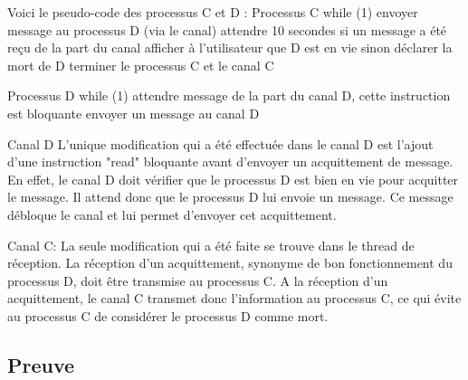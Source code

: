 \documentclass[a4paper, 10pt, french]{article}
\begin{document}
Voici le pseudo-code des processus C et D : 
Processus C
while (1) {
	envoyer message au processus D (via le canal)
	attendre 10 secondes
	si un message a été reçu de la part du canal {
		afficher à l'utilisateur que D est en vie
	} sinon {
		déclarer la mort de D
		terminer le processus C et le canal C
	}
}


Processus D
while (1) {
	attendre message de la part du canal D, cette instruction est bloquante
	envoyer un message au canal D
}

Canal D
L'unique modification qui a été effectuée dans le canal D est l'ajout d'une instruction "read" bloquante avant d'envoyer un acquittement de message. En effet, le canal D doit vérifier que le processus D est bien en vie pour acquitter le message. Il attend donc que le processus D lui envoie un message. Ce message débloque le canal et lui permet d'envoyer cet acquittement.

Canal C:
La seule modification qui a été faite se trouve dans le thread de réception. La réception d'un acquittement, synonyme de bon fonctionnement du processus D, doit être transmise au processus C. A la réception d'un acquittement, le canal C transmet donc l'information au processus C, ce qui évite au processus C de considérer le processus D comme mort.

\subsection{Preuve}
\end{document}
